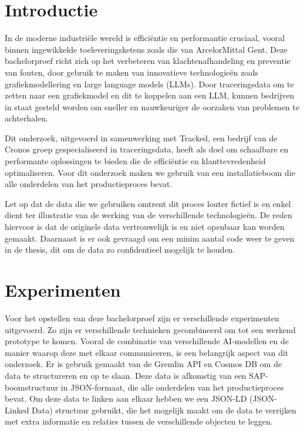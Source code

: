 \documentclass[a0,portrait]{hogent-poster}
\begin{document}
\begin{multicols}{2} %

\section{Introductie}

In de moderne industriële wereld is efficiëntie en performantie cruciaal, vooral binnen ingewikkelde toeleveringsketens zoals die van ArcelorMittal Gent. 
Deze bachelorproef richt zich op het verbeteren van klachtenafhandeling en preventie van fouten, door gebruik te maken van innovatieve technologieën zoals grafiekmodellering en large language models (LLMs). 
Door traceringsdata om te zetten naar een grafiekmodel en dit te koppelen aan een LLM, kunnen bedrijven in staat gesteld worden om sneller en nauwkeuriger de oorzaken van problemen te achterhalen. 

Dit onderzoek, uitgevoerd in samenwerking met Tracked, een bedrijf van de Cronos groep gespecialiseerd in traceringsdata, heeft als doel om schaalbare en performante oplossingen te bieden die de efficiëntie en klanttevredenheid optimaliseren.
Voor dit onderzoek maken we gebruik van een installatieboom die alle onderdelen van het productieproces bevat.

Let op dat de data die we gebruiken omtrent dit proces louter fictief is en enkel dient ter illustratie van de werking van de verschillende technologieën.
De reden hiervoor is dat de originele data vertrouwelijk is en niet openbaar kan worden gemaakt. 
Daarnaast is er ook gevraagd om een minim aantal code weer te geven in de thesis, dit om de data zo confidentieel mogelijk te houden.

\section{Experimenten}
Voor het opstellen van deze bachelorproef zijn er verschillende experimenten uitgevoerd.
Zo zijn er verschillende technieken gecombineerd om tot een werkend prototype te komen. 
Vooral de combinatie van verschillende AI-modellen en de manier waarop deze met elkaar communiceren, is een belangrijk aspect van dit onderzoek.
Er is gebruik gemaakt van de Gremlin API en Cosmos DB om de data te structureren en op te slaan.
Deze data is afkomstig van een SAP-boomstructuur in JSON-formaat, die alle onderdelen van het productieproces bevat.
Om deze data te linken aan elkaar hebben we een JSON-LD (JSON-Linked Data) structuur gebruikt, die het mogelijk maakt om de data te verrijken met extra informatie en relaties tussen de verschillende objecten te leggen.

\end{multicols}
\end{document}
